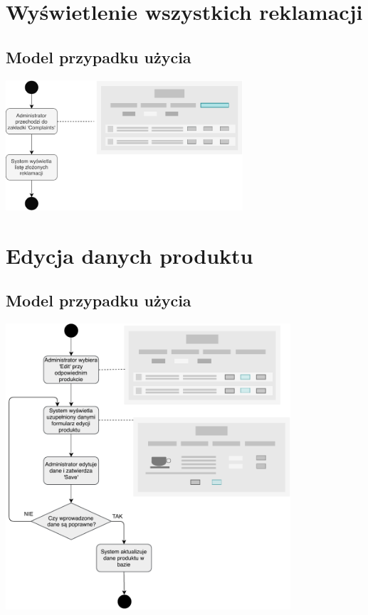 \documentclass[10pt]{report}
\begin{document}
	
	\section{Wyświetlenie wszystkich reklamacji}
		\subsection{Model przypadku użycia}
			\begin{center}
				\includegraphics[width=250pt]{reklamacje.pdf}
			\end{center}
	
	
	\section{Edycja danych produktu}
		\subsection{Model przypadku użycia}
			\begin{center}
				\includegraphics[width=300pt]{edytuj_admin.pdf}
			\end{center}
		
\end{document}
